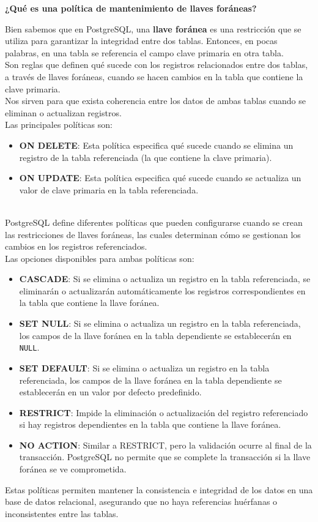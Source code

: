 \begin{center}
    \textbf{¿Qué es una política de mantenimiento de llaves foráneas?}   
\end{center}

Bien sabemos que en PostgreSQL, una \textbf{llave foránea} es una restricción que se utiliza para garantizar la integridad entre dos tablas. Entonces, en pocas palabras, en una tabla se referencia el campo clave primaria en otra tabla. \\

Son reglas que definen qué sucede con los registros relacionados entre dos tablas, a través de llaves foráneas, cuando se hacen cambios en la tabla que contiene la clave primaria. \\

Nos sirven para que exista coherencia entre los datos de ambas tablas cuando se eliminan o actualizan registros. \\

Las principales políticas son:

\begin{itemize}
    \item \textbf{ON DELETE}: Esta política especifica qué sucede cuando se elimina un registro de la tabla referenciada (la que contiene la clave primaria).
    \item \textbf{ON UPDATE}: Esta política especifica qué sucede cuando se actualiza un valor de clave primaria en la tabla referenciada.
\end{itemize}
\\

PostgreSQL define diferentes políticas que pueden configurarse cuando
se crean las restricciones de llaves foráneas, las cuales determinan
cómo se gestionan los cambios en los registros referenciados. \\

Las opciones disponibles para ambas políticas son:

\begin{itemize}
    \item \textbf{CASCADE}: Si se elimina o actualiza un registro en la tabla referenciada, se eliminarán o actualizarán automáticamente los registros correspondientes en la tabla que contiene la llave foránea.
    \item \textbf{SET NULL}: Si se elimina o actualiza un registro en la tabla referenciada, los campos de la llave foránea en la tabla dependiente se establecerán en \texttt{NULL}.
    \item \textbf{SET DEFAULT}: Si se elimina o actualiza un registro en la tabla referenciada, los campos de la llave foránea en la tabla dependiente se establecerán en un valor por defecto predefinido.
    \item \textbf{RESTRICT}: Impide la eliminación o actualización del registro referenciado si hay registros dependientes en la tabla que contiene la llave foránea.
    \item \textbf{NO ACTION}: Similar a RESTRICT, pero la validación ocurre al final de la transacción. PostgreSQL no permite que se complete la transacción si la llave foránea se ve comprometida.
\end{itemize}

Estas políticas permiten mantener la consistencia e integridad de los datos en una base de datos relacional, asegurando que no haya referencias huérfanas o inconsistentes entre las tablas. \\
